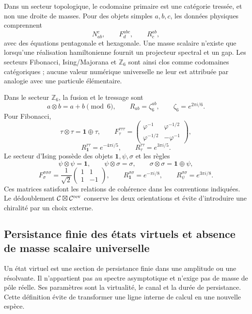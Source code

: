 Dans un secteur topologique, le codomaine primaire est une catégorie tressée, et non
une droite de masses. Pour des objets simples \(a,b,c\), les données physiques comprennent
\[
 N_{ab}^{c},\qquad F^{abc}_{d},\qquad R^{ab}_{c},
\]
avec des équations pentagonale et hexagonale. Une masse scalaire n'existe que
lorsqu'une réalisation hamiltonienne fournit un projecteur spectral et un
gap. Les secteurs Fibonacci, Ising/Majorana et \(\mathbb Z_6\) sont ainsi
clos comme codomaines catégoriques ; aucune valeur numérique universelle ne leur est attribuée
par analogie avec une particule élémentaire.

Dans le secteur \(\mathbb Z_6\), la fusion et le tressage sont
\[
 a\otimes b=a+b\pmod 6,
 \qquad
 R_{ab}=\zeta_6^{ab},
 \qquad \zeta_6=e^{2\pi i/6}.
\]
Pour Fibonacci,
\[
 \tau\otimes\tau=\mathbf 1\oplus\tau,
 \qquad
 F_\tau^{\tau\tau\tau}=
 \begin{pmatrix}
 \varphi^{-1}&\varphi^{-1/2}\\
 \varphi^{-1/2}&-\varphi^{-1}
 \end{pmatrix},
\]
\[
 R_{\mathbf1}^{\tau\tau}=e^{-4\pi i/5},
 \qquad
 R_\tau^{\tau\tau}=e^{3\pi i/5}.
\]
Le secteur d'Ising possède des objets \(\mathbf1,\psi,\sigma\) et les règles
\[
 \psi\otimes\psi=\mathbf1,
 \qquad
 \psi\otimes\sigma=\sigma,
 \qquad
 \sigma\otimes\sigma=\mathbf1\oplus\psi,
\]
\[
 F_\sigma^{\sigma\sigma\sigma}
 =\frac1{\sqrt2}
 \begin{pmatrix}1&1\\1&-1\end{pmatrix},
 \qquad
 R_{\mathbf1}^{\sigma\sigma}=e^{-\pi i/8},
 \qquad
 R_\psi^{\sigma\sigma}=e^{3\pi i/8}.
\]
Ces matrices satisfont les relations de cohérence dans les conventions
indiquées. Le dédoublement
\(\mathcal C\boxtimes\mathcal C^{\rm rev}\) conserve les deux orientations et
évite d'introduire une chiralité par un choix externe.

\subsection{Persistance finie des états virtuels et absence de masse scalaire universelle}

Un état virtuel est une section de persistance finie dans une amplitude ou une
résolvante. Il n'appartient pas au spectre asymptotique et n'exige pas de masse de pôle
réelle. Ses paramètres sont la virtualité, le canal et la durée de
persistance. Cette définition évite de transformer une ligne interne de calcul en
une nouvelle espèce.

